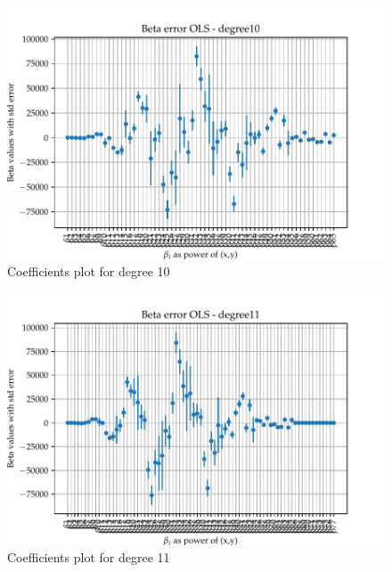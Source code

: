 \documentclass[11pt, a4paper]{article}
\begin{document}

\begin{figure}
  \centering
  \hspace*{-4.2cm}  
  \includegraphics[scale=0.52]{figures/EX6_EX1_OLS_beta_error_degree10.pdf}
  \caption{Coefficients plot for degree 10}
  \label{fig:EX6_1_OLS_betas_plot_degree10}
\end{figure}

\begin{figure}
  \centering
  \hspace*{-4.2cm}  
  \includegraphics[scale=0.52]{figures/EX6_EX1_OLS_beta_error_degree11.pdf}
  \caption{Coefficients plot for degree 11}
  \label{fig:EX6_1_OLS_betas_plot_degree11}
\end{figure}
\end{document}
